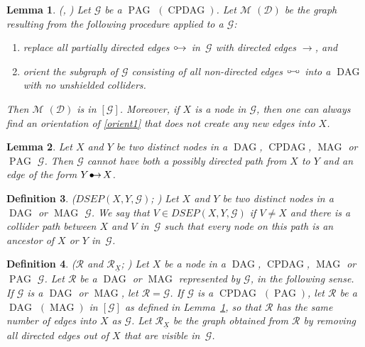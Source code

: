\documentclass[11pt,a4paper]{article}
\newtheorem{definition}{Definition}
\newtheorem{lemma}[definition]{Lemma}
\DeclareMathOperator{\CPDAG}{CPDAG}
\DeclareMathOperator{\DAG}{DAG}
\DeclareMathOperator{\MAG}{MAG}
\DeclareMathOperator{\PAG}{PAG}
\newcommand{\g}[1][G]{\mathcal{#1}}
\newcommand{\dsep}[2][X,Y]{DSEP(#1,#2)}
\newcommand{\bulletarrow}{
  \setlength{\unitlength}{1mm}
  \begin{picture}(5,1)(0,0)
    \put(0.2,0){$\bullet$}
    \put(1,0){$\rightarrow$}
  \end{picture}
}
\newcommand{\circarrow}{
  \setlength{\unitlength}{1mm}
  \begin{picture}(5,1)(0,0)
    \put(1,1){\circle{1}}
    \put(1.2,0){$\rightarrow$}
  \end{picture}
}
\newcommand{\circcirc}{
  \setlength{\unitlength}{1mm}
  \begin{picture}(5,1)(0,0)
    \put(1,1){\circle{1}}
    \put(1.5,1){\line(1,0){2}}
    \put(4,1){\circle{1}}
  \end{picture}
}
\begin{document}
\begin{lemma}
   {(\citealp[cf.\ Theorem~2 in][]{zhang2008completeness}, \citealp[Lemma~7.6 in][]{maathuis2013generalized})} Let $\g$ be a $\PAG$ $(\CPDAG)$. Let $\g[M]$ $(\g[D])$ be the graph resulting from the following procedure applied to a $\g$:
 \begin{enumerate}[label=(\arabic*)]
\item replace all partially directed edges $\circarrow$ in~$\g$ with directed edges $\rightarrow$, and
\item\label{orient1} orient the subgraph of $\g$ consisting of all non-directed edges $\circcirc$ into a $\DAG$ with no unshielded colliders.
\end{enumerate}
Then $\g[M]$ $(\g[D])$ is in $[\g]$. Moreover, if $X$ is a node in $\g$, then one can always find an orientation of \ref{orient1} that does not create any new edges into $X$.
   \label{lemmamarlrx}
\end{lemma}


\begin{lemma}
   {\citep[Lemma~7.5 in][]{maathuis2013generalized}} Let $X$ and $Y$ be two distinct nodes in a $\DAG$, $\CPDAG$, $\MAG$ or $\PAG$ $\g$. Then $\g$ cannot have both a possibly directed path from $X$ to $Y$ and an edge of the form $Y \bulletarrow X$.
   \label{lemmamarlcycle}
\end{lemma}

\begin{definition}{(\textbf{$\dsep{\g}$}; \citealp[][p136]{spirtes2000causation})} Let $X$ and $Y$ be two distinct nodes in a $\DAG$ or $\MAG$ $\g$. We say that $V \in \dsep{\g}$ if $V \neq X$ and there is a collider path between $X$ and $V$ in~$\g$ such that every node on this path is an ancestor of $X$ or $Y$ in~$\g$.
\label{def:dsep}
\end{definition}

\begin{definition}($\g[R]$ and $\g[R]_{\underline{X}}$; \citealp{maathuis2013generalized}) 
Let $X$ be a node in a $\DAG$, $\CPDAG$, $\MAG$ or $\PAG$ $\g$.
Let $\g[R]$ be a $\DAG$ or $\MAG$ represented by $\g$, in the following sense. If $\g$ is a $\DAG$ or $\MAG$, let $\g[R] = \g$. If $\g$ is a $\CPDAG$ $(\PAG)$, let $\g[R]$ be a $\DAG$ $(\MAG)$ in $[\g]$ as defined in Lemma~\ref{lemmamarlrx}, so that $\g[R]$ has the same number of edges into $X$ as $\g$.
Let $\g[R]_{\underline{X}}$ be the graph obtained from $\g[R]$ by removing all directed edges out of $X$ that are visible in~$\g$.
\label{def:rx}
\end{definition}
\end{document}
